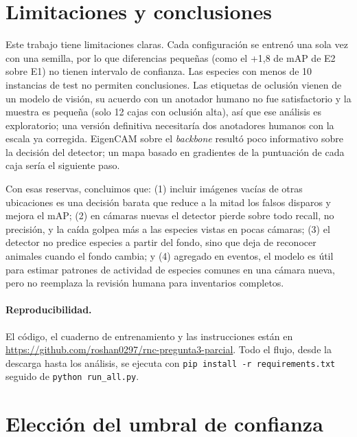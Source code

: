 \documentclass{article}
\begin{document}
\section{Limitaciones y conclusiones}
\label{sec:conclusiones}

Este trabajo tiene limitaciones claras. Cada configuración se entrenó una sola
vez con una semilla, por lo que diferencias pequeñas (como el +1,8 de mAP de
E2 sobre E1) no tienen intervalo de confianza. Las especies con menos de 10
instancias de test no permiten conclusiones. Las etiquetas de oclusión vienen de un modelo de visión, su
acuerdo con un anotador humano no fue satisfactorio y la muestra es pequeña
(solo 12 cajas con oclusión alta), así que ese análisis es exploratorio; una
versión definitiva necesitaría dos anotadores humanos con la escala ya
corregida. EigenCAM sobre el \emph{backbone} resultó
poco informativo sobre la decisión del detector; un mapa basado en gradientes
de la puntuación de cada caja sería el siguiente paso.

Con esas reservas, concluimos que: (1) incluir imágenes vacías de otras
ubicaciones es una decisión barata que reduce a la mitad los falsos disparos y
mejora el mAP; (2) en cámaras nuevas el detector pierde sobre todo recall, no
precisión, y la caída golpea más a las especies vistas en pocas cámaras;
(3) el detector no predice especies a partir del fondo, sino que deja de
reconocer animales cuando el fondo cambia; y (4) agregado en eventos, el modelo
es útil para estimar patrones de actividad de especies comunes en una cámara
nueva, pero no reemplaza la revisión humana para inventarios completos.

\paragraph{Reproducibilidad.} El código, el cuaderno de entrenamiento y las
instrucciones están en
\url{https://github.com/roshan0297/rnc-pregunta3-parcial}. Todo el flujo,
desde la descarga hasta los análisis, se ejecuta con
\texttt{pip install -r requirements.txt} seguido de \texttt{python run\_all.py}.

{\small


}

\clearpage
\appendix
\section{Elección del umbral de confianza}
\label{app:f1}
\end{document}
